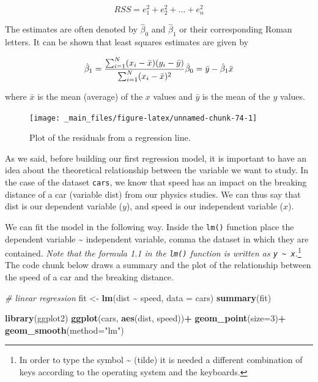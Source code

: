 \documentclass[
]{svmono}
\newenvironment{Shaded}{\begin{snugshade}}{\end{snugshade}}
\newcommand{\AttributeTok}[1]{\textcolor[rgb]{0.13,0.29,0.53}{#1}}
\newcommand{\CommentTok}[1]{\textcolor[rgb]{0.56,0.35,0.01}{\textit{#1}}}
\newcommand{\DecValTok}[1]{\textcolor[rgb]{0.00,0.00,0.81}{#1}}
\newcommand{\FunctionTok}[1]{\textcolor[rgb]{0.13,0.29,0.53}{\textbf{#1}}}
\newcommand{\NormalTok}[1]{#1}
\newcommand{\OtherTok}[1]{\textcolor[rgb]{0.56,0.35,0.01}{#1}}
\newcommand{\SpecialCharTok}[1]{\textcolor[rgb]{0.81,0.36,0.00}{\textbf{#1}}}
\newcommand{\StringTok}[1]{\textcolor[rgb]{0.31,0.60,0.02}{#1}}
\begin{document}
\begin{equation}
RSS=e_1^2+e_2^2+...+e_n^2
\label{eq:rss}
\end{equation}

The estimates are often denoted by \(\hat\beta_0\) and \(\hat\beta_1\) or
their corresponding Roman letters. It can be shown that least squares
estimates are given by

\begin{equation}
\hat\beta_1=\frac{\sum_{i=1}^N(x_i-\bar{x})(y_i-\bar{y})}{\sum_{i=1}^N(x_i-\bar{x})^2} \\
\hat\beta_0=\bar{y}-\hat\beta_1 \bar{x}
\end{equation}

where \(\bar{x}\) is the mean (average) of the \(x\) values and \(\bar{y}\)
is the mean of the \(y\) values.

\begin{figure}[H]

{\centering \texttt{[image: \_main\_files/figure-latex/unnamed-chunk-74-1]} 

}

\caption{Plot of the residuals from a regression line.}\label{fig:unnamed-chunk-74}
\end{figure}

As we said, before building our first regression model, it is important
to have an idea about the theoretical relationship between the variable
we want to study. In the case of the dataset \texttt{cars}, we know that speed
has an impact on the breaking distance of a car (variable dist) from our
physics studies. We can thus say that dist is our dependent variable
(\(y\)), and speed is our independent variable (\(x\)).

We can fit the model in the following way. Inside the \texttt{lm()} function
place the dependent variable \textasciitilde{} independent variable, comma the dataset
in which they are contained. \emph{Note that the formula 1.1 in the \texttt{lm()}
function is written as \texttt{y\ \textasciitilde{}\ x}.}\footnote{In order to type the symbol \textasciitilde{} (tilde) it is needed a different
  combination of keys according to the operating system and the
  keyboards.} The code chunk below draws a
summary and the plot of the relationship between the speed of a car and
the breaking distance.

\begin{Shaded}
\begin{Highlighting}[]
\CommentTok{\# linear regression}
\NormalTok{fit }\OtherTok{\textless{}{-}} \FunctionTok{lm}\NormalTok{(dist }\SpecialCharTok{\textasciitilde{}}\NormalTok{ speed, }\AttributeTok{data =}\NormalTok{ cars)}
\FunctionTok{summary}\NormalTok{(fit)}

\FunctionTok{library}\NormalTok{(ggplot2)}
\FunctionTok{ggplot}\NormalTok{(cars, }\FunctionTok{aes}\NormalTok{(dist, speed))}\SpecialCharTok{+}
        \FunctionTok{geom\_point}\NormalTok{(}\AttributeTok{size=}\DecValTok{3}\NormalTok{)}\SpecialCharTok{+}
        \FunctionTok{geom\_smooth}\NormalTok{(}\AttributeTok{method=}\StringTok{"lm"}\NormalTok{)}
\end{Highlighting}
\end{Shaded}
\end{document}
